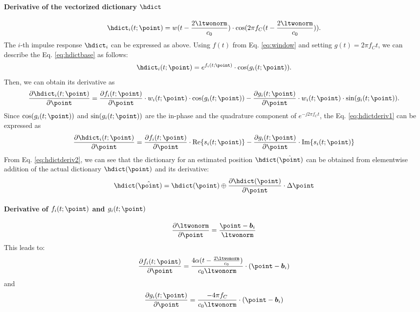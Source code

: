 \documentclass{article}
\begin{document}
\paragraph*{Derivative of the vectorized dictionary $\hdict$}
\begin{equation} \label{eq:hdictbase}
\hdict_{i} (t; \point) = w(t - \frac{2 \ltwonorm}{c_0}) \cdot \cos(2 \pi f_C (t - \frac{2 \ltwonorm}{c_0})) .
\end{equation}
%
The $i$-th impulse response $\hdict_{i}$ can be expressed as above. Using $f(t)$ from Eq. \ref{eq:window} and setting $g(t) = 2 \pi f_C t$, we can describe  the Eq. \ref{eq:hdictbase} as follows:
\begin{equation}
\hdict_{i} (t; \point) = e^{ f_{i}( t ; \point) } \cdot \cos( g_{i}(t; \point) ).
\end{equation}
%
Then, we can obtain its derivative as
\begin{equation} \label{eq:hdictderiv1}
\frac{\partial \hdict_{i} (t; \point) }{\partial \point} = \frac{\partial f_{i}( t ; \point)}{\partial \point} \cdot w_{i}(t; \point) \cdot \cos( g_{i}(t; \point) ) - \frac{\partial g_{i}( t ; \point)}{\partial \point} \cdot w_{i}(t; \point) \cdot \sin( g_{i}(t; \point) ) .
\end{equation}
%
Since $\cos( g_{i}(t; \point) )$ and  $\sin( g_{i}(t; \point) )$ are the in-phase and the quadrature component of $ e^{- j 2 \pi f_C t} $, the Eq. \ref{eq:hdictderiv1} can be expressed as
\begin{equation}\label{eq:hdictderiv2}
\frac{\partial \hdict_{i} (t; \point) }{\partial \point} = \frac{\partial f_{i}( t ; \point)}{\partial \point} \cdot \Real \{ s_{i} (t; \point) \} - \frac{\partial g_{i}( t ; \point)}{\partial \point} \cdot \Imag \{ s_{i} (t; \point) \}
\end{equation}
From Eq. \ref{eq:hdictderiv2}, we can see that the dictionary for an estimated position $\hdict (\hat{\point})$ can be obtained from elementwise addition of the actual dictionary $\hdict(\point)$ and its derivative:
\begin{equation} \label{eq:Hdictderiv}
\hdict (\hat{\point}) = \hdict(\point) \oplus \frac{\partial \hdict(\point)}{\partial \point} \cdot \Delta \point
\end{equation} 

\paragraph*{Derivative of $f_{i}( t ; \point)$ and $g_{i}( t ; \point)$}
\begin{equation}
\frac{\partial \ltwonorm }{\partial \point} = \frac{\point - \defect_{i}}{ \ltwonorm }
\end{equation}
This leads to:
\begin{equation}
\frac{\partial f_{i}( t ; \point)}{\partial \point} = \frac{4 \alpha (t - \frac{2 \ltwonorm }{c_0})}{c_0 \ltwonorm} \cdot (\point - \defect_{i})
\end{equation}
and
\begin{equation}
\frac{\partial g_{i}( t ; \point)}{\partial \point} = \frac{- 4 \pi f_C}{c_0 \ltwonorm} \cdot (\point - \defect_{i})
\end{equation}
\end{document}
